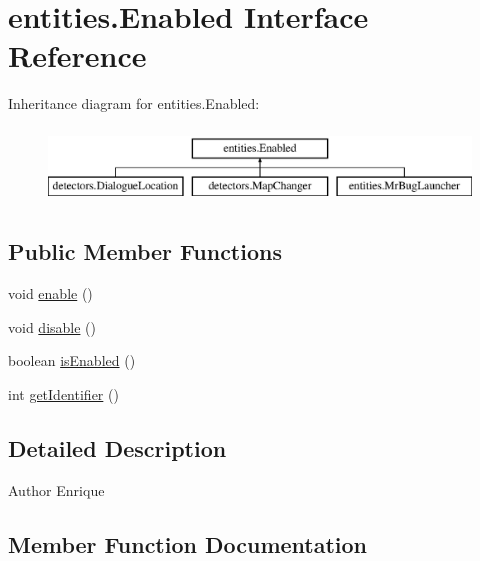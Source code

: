 \hypertarget{interfaceentities_1_1_enabled}{}\section{entities.\+Enabled Interface Reference}
\label{interfaceentities_1_1_enabled}
Inheritance diagram for entities.\+Enabled\+:\begin{figure}[H]
\begin{center}
\leavevmode
\includegraphics[height=2.000000cm]{interfaceentities_1_1_enabled}
\end{center}
\end{figure}
\subsection*{Public Member Functions}
\begin{DoxyCompactItemize}
\item 
void \mbox{\hyperlink{interfaceentities_1_1_enabled_a0c6a44be8f9b87d4e0ddf93dad67232a}{enable}} ()
\item 
void \mbox{\hyperlink{interfaceentities_1_1_enabled_a1aad7d7176a83876b92f54e2b31fa1e4}{disable}} ()
\item 
boolean \mbox{\hyperlink{interfaceentities_1_1_enabled_a3d453026138fed321aed73816b331b49}{is\+Enabled}} ()
\item 
int \mbox{\hyperlink{interfaceentities_1_1_enabled_afbf595b80729c70944d508375ea7a5fd}{get\+Identifier}} ()
\end{DoxyCompactItemize}


\subsection{Detailed Description}
\begin{DoxyAuthor}{Author}
Enrique 
\end{DoxyAuthor}


\subsection{Member Function Documentation}
\mbox{\label{interfaceentities_1_1_enabled_a1aad7d7176a83876b92f54e2b31fa1e4}} 

